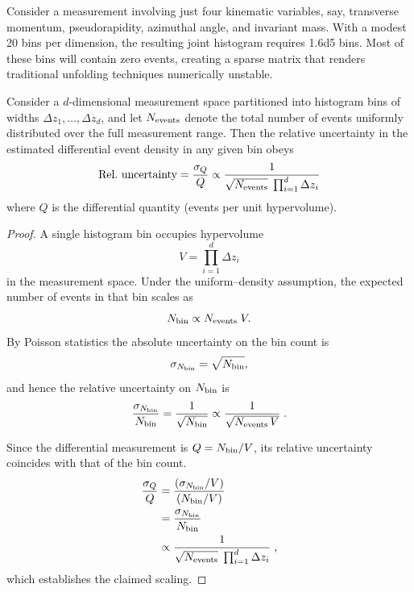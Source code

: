             Consider a measurement involving just four kinematic variables, say, transverse momentum, pseudorapidity, azimuthal angle, and invariant mass.
            With a modest 20 bins per dimension, the resulting joint histogram requires \num{1.6d5} bins.
            Most of these bins will contain zero events, creating a sparse matrix that renders traditional unfolding techniques numerically unstable.
            
            \begin{theorem}
                \label{prop:relative-uncertainty}
                Consider a \(d\)-dimensional measurement space partitioned into histogram bins of widths \(\Delta z_1,\dots,\Delta z_d\), and let \(N_{\rm events}\) denote the total number of events uniformly distributed over the full measurement range.
                Then the relative uncertainty in the estimated differential event density in any given bin obeys
                \begin{equation}
                    \text{Rel.\ uncertainty} = \frac{\sigma_{Q}}{Q} \propto \frac{1}{\sqrt{N_{\rm events}}\;\prod_{i=1}^d\Delta z_i}
                \end{equation}
                where \(Q\) is the differential quantity (events per unit hypervolume).
            \end{theorem}
                
            \begin{proof}
                A single histogram bin occupies hypervolume
                \[
                    V = \prod_{i=1}^d \Delta z_i
                \]
                in the measurement space.
                Under the uniform--density assumption, the expected number of events in that bin scales as
                \[
                    N_{\rm bin} \propto N_{\rm events}\;V.
                \]
                By Poisson statistics the absolute uncertainty on the bin count is
                \[
                    \sigma_{N_{\rm bin}} = \sqrt{N_{\rm bin}},
                \]
                and hence the relative uncertainty on \(N_{\rm bin}\) is
                \[
                    \frac{\sigma_{N_{\rm bin}}}{N_{\rm bin}} = \frac{1}{\sqrt{N_{\rm bin}}} \propto \frac{1}{\sqrt{N_{\rm events}\,V}}\;.
                \]
                
                Since the differential measurement is \(Q = N_{\rm bin}/V\), its relative uncertainty coincides with that of the bin count.
                \begin{align}
                    \frac{\sigma_Q}{Q} &= \frac{(\sigma_{N_{\rm bin}}/V)}{(N_{\rm bin}/V)} \\
                    &= \frac{\sigma_{N_{\rm bin}}}{N_{\rm bin}} \\
                    &\propto \frac{1}{\sqrt{N_{\rm events}}\;\prod_{i=1}^d\Delta z_i}\;,
                \end{align}
                which establishes the claimed scaling.
            \end{proof}
            
